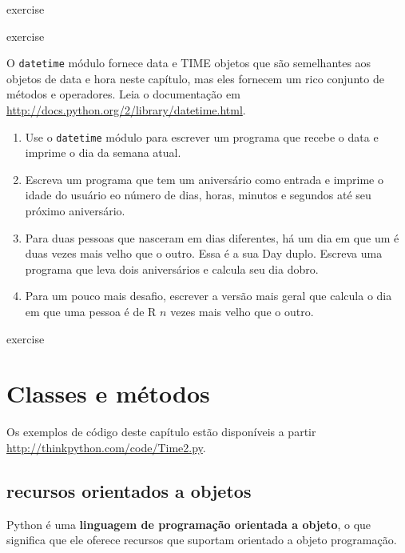\documentclass[10pt]{book}
\begin{document}
\begin{exercise}
\begin{v erbatim}
{\begin{}
\end{} exercise


\begin{} exercise

O {\tt datetime} módulo fornece {data \tt} e {TIME \tt} objetos
que são semelhantes aos objetos de data e hora neste capítulo, mas
eles fornecem um rico conjunto de métodos e operadores. Leia o
documentação em \url{http://docs.python.org/2/library/datetime.html}.

\begin{enumerate}

\item Use o {\tt datetime} módulo para escrever um programa que recebe o
  data e imprime o dia da semana atual.

\item Escreva um programa que tem um aniversário como entrada e imprime o
  idade do usuário eo número de dias, horas, minutos e segundos até
  seu próximo aniversário.

\item Para duas pessoas que nasceram em dias diferentes, há um dia em que um
  é duas vezes mais velho que o outro. Essa é a sua Day duplo. Escreva uma
  programa que leva dois aniversários e calcula seu dia dobro.

\item Para um pouco mais desafio, escrever a versão mais geral que
  calcula o dia em que uma pessoa é de R $ n $ vezes mais velho que o outro.

\end{enumerate}

\end{} exercise


\chapter{Classes e métodos}

Os exemplos de código deste capítulo estão disponíveis a partir
\url{http://thinkpython.com/code/Time2.py}.

\section{recursos orientados a objetos}

Python é uma {\bf linguagem de programação orientada a objeto}, o que significa
que ele oferece recursos que suportam orientado a objeto
programação.

}
\end{v erbatim}
\end{exercise}
\end{document}
